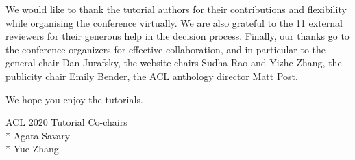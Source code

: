 We would like to thank the tutorial authors for their contributions and flexibility while organising the conference virtually.  We are also grateful to the 11 external reviewers for their generous help in the decision process. Finally, our thanks go to the conference organizers for effective collaboration, and in particular to the general chair Dan Jurafsky, the website chairs Sudha Rao and Yizhe Zhang, the publicity chair Emily Bender, the ACL anthology director Matt Post.

We hope you enjoy the tutorials.

\bigskip
\noindent ACL 2020 Tutorial Co-chairs  \\*  %
\noindent Agata Savary  \\*  %
\noindent Yue Zhang
